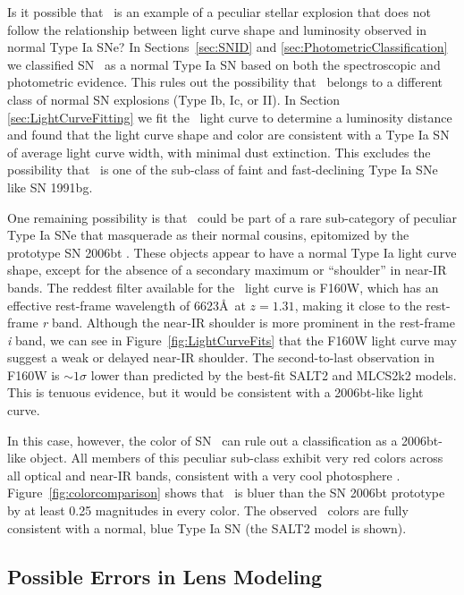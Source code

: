 Is it possible that \tomas\ is an example of a peculiar stellar
explosion that does not follow the relationship between light curve
shape and luminosity observed in normal Type Ia SNe?  In
Sections~\ref{sec:SNID} and \ref{sec:PhotometricClassification} we
classified SN \tomas\ as a normal Type Ia SN based on both the
spectroscopic and photometric evidence.  This rules out the
possibility that \tomas\ belongs to a different class of normal SN
explosions (Type Ib, Ic, or II). In
Section \ref{sec:LightCurveFitting} we fit the \tomas\ light curve to
determine a luminosity distance and found that the light curve shape
and color are consistent with a Type Ia SN of average light curve
width, with minimal dust extinction.  This excludes the possibility
that \tomas\ is one of the sub-class of faint and fast-declining Type
Ia SNe like SN 1991bg.

One remaining possibility is that \tomas\ could be part of a rare
sub-category of peculiar Type Ia SNe that masquerade as their normal
cousins, epitomized by the prototype SN 2006bt \citep{Foley:2010}.
These objects appear to have a normal Type Ia light curve shape,
except for the absence of a secondary maximum or ``shoulder'' in
near-IR bands.  The reddest filter available for the \tomas\ light
curve is F160W, which has an effective rest-frame wavelength of
6623\AA\ at $z=1.31$, making it close to the rest-frame {\it r} band.
Although the near-IR shoulder is more prominent in the rest-frame {\it
i} band, we can see in Figure~\ref{fig:LightCurveFits} that the F160W
light curve may suggest a weak or delayed near-IR shoulder.  The
second-to-last observation in F160W is $\sim1\sigma$ lower than
predicted by the best-fit SALT2 and MLCS2k2 models. This is tenuous
evidence, but it would be consistent with a 2006bt-like light curve.

In this case, however, the color of SN \tomas\ can rule out a
classification as a 2006bt-like object.  All members of this peculiar
sub-class exhibit very red colors across all optical and near-IR
bands, consistent with a very cool photosphere \citep{Foley:2010}.
Figure~\ref{fig:colorcomparison} shows that \tomas\ is bluer than the
SN 2006bt prototype by at least 0.25 magnitudes in every color. The
observed \tomas\ colors are fully consistent with a normal, blue
Type Ia SN (the SALT2 model is shown).



\subsection{Possible Errors in Lens Modeling}
\label{sec:LensModelErrors}

